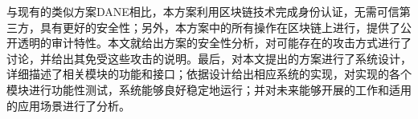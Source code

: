 \begin{cabstract}
与现有的类似方案DANE相比，本方案利用区块链技术完成身份认证，无需可信第三方，具有更好的安全性；另外，本方案中的所有操作在区块链上进行，提供了公开透明的审计特性。本文就给出方案的安全性分析，对可能存在的攻击方式进行了讨论，并给出其免受这些攻击的说明。最后，对本文提出的方案进行了系统设计，详细描述了相关模块的功能和接口；依据设计给出相应系统的实现，对实现的各个模块进行功能性测试，系统能够良好稳定地运行；并对未来能够开展的工作和适用的应用场景进行了分析。



 







\end{cabstract}
